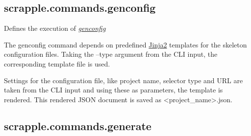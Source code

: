 \documentclass[letterpaper,12pt,english]{sphinxmanual}
\begin{document}
\subsection{scrapple.commands.genconfig}
\label{implementation/commands:scrapple-commands-genconfig}

\begin{fulllineitems}
\label{implementation/commands:scrapple.commands.genconfig.GenconfigCommand}
Defines the execution of {\hyperref[framework/commands:command-genconfig]{\emph{genconfig}}}

\begin{fulllineitems}
\label{implementation/commands:scrapple.commands.genconfig.GenconfigCommand.execute_command}
The genconfig command depends on predefined \href{http://jinja.pocoo.org/}{Jinja2}         templates for the skeleton configuration files. Taking the --type argument from the         CLI input, the corresponding template file is used.

Settings for the configuration file, like project name, selector type and URL         are taken from the CLI input and using these as parameters, the template is         rendered. This rendered JSON document is saved as \textless{}project\_name\textgreater{}.json.

\end{fulllineitems}


\end{fulllineitems}

\label{implementation/commands:module-scrapple.commands.generate}

\subsection{scrapple.commands.generate}
\label{implementation/commands:scrapple-commands-generate}
\end{document}
